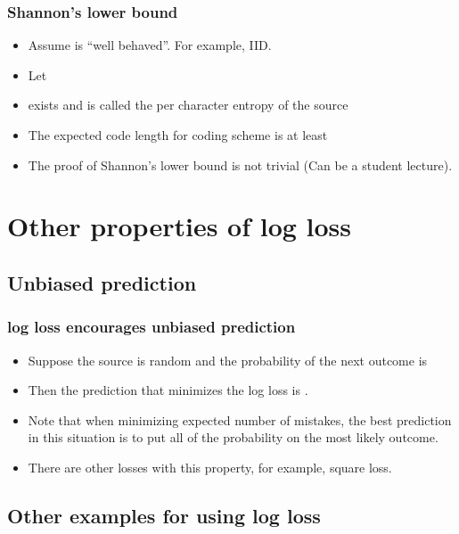 \documentclass[handout]{beamer}
\begin{document}
\begin{frame}
\frametitle{Shannon's lower bound}
\begin{itemize}
\item Assume  is ``well behaved''. For example, IID.
\item Let 
\item {} exists and is called the per character entropy of the source 
\item The expected code length for  coding scheme is at least 
\R{\[
\paren{1-o(1)} H(p_T) = \paren{1-o(1)}\; T\; H(p)
\]}
\item The proof of Shannon's lower bound is not trivial (Can be a
  student lecture).
\end{itemize}
\end{frame}

\section{Other properties of log loss}

\subsection{Unbiased prediction}
\begin{frame}
\frametitle{log loss encourages unbiased prediction}
\begin{itemize}
\item Suppose the source is random and the probability of the next outcome is  
\item Then the prediction that minimizes the log loss is .
\item Note that when minimizing expected number of mistakes, the best prediction in this situation is to put all of the probability on the
most likely outcome.
\item There are other losses with this property, for example, square loss.
\end{itemize}
\end{frame}

\subsection{Other examples for using log loss}
\end{document}
